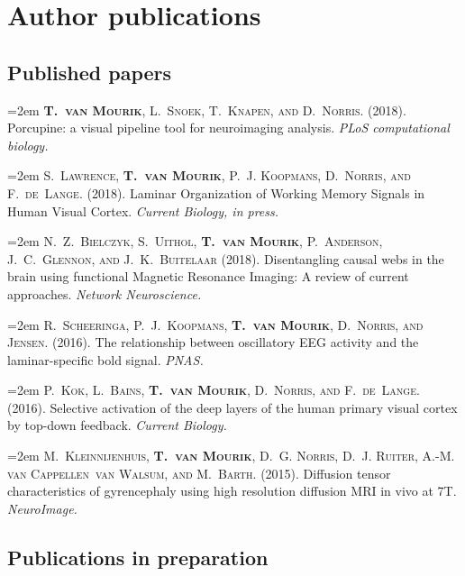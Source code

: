 \section{Author publications}

\subsection{Published papers}

\hangindent=2em
\noindent
\textsc{\textbf{T.~van Mourik}, L.~Snoek, T.~Knapen, and D.~Norris.} 
(2018).
Porcupine: a visual pipeline tool for neuroimaging analysis.
\emph{PLoS computational biology.}


\hangindent=2em
\noindent
\textsc{S.~Lawrence, \textbf{T.~van Mourik}, P.~J. Koopmans, D.~Norris, and F.~de~Lange.} 
(2018).
Laminar Organization of Working Memory Signals in Human Visual Cortex. 
\emph{Current Biology, in press.}


\hangindent=2em
\noindent
\textsc{N.~Z.~Bielczyk, S.~Uithol, \textbf{T.~van Mourik}, P.~Anderson, J.~C.~Glennon, and J.~K.~Buitelaar} 
(2018).
Disentangling causal webs in the brain using functional Magnetic Resonance Imaging: A review of current approaches.
\emph{Network Neuroscience.}


\hangindent=2em
\noindent
\textsc{R.~Scheeringa, P.~J.~Koopmans, \textbf{T.~van Mourik}, D.~Norris, and Jensen.} 
(2016).
The relationship between oscillatory {EEG} activity and the laminar-specific bold signal.
\emph{PNAS.}


\hangindent=2em
\noindent
\textsc{P.~Kok, L.~Bains, \textbf{T.~van Mourik}, D.~Norris, and F.~de~Lange.} 
(2016).
Selective activation of the deep layers of the human primary visual	cortex by top-down feedback.
\emph{Current Biology.}


\hangindent=2em
\noindent
\textsc{M.~Kleinnijenhuis, \textbf{T.~van Mourik}, D.~G. Norris, D.~J. Ruiter, A.-M. van	Cappellen~van Walsum, and M.~Barth.} 
(2015).
Diffusion tensor characteristics of gyrencephaly using high	resolution diffusion {MRI} in vivo at 7{T}.
\emph{NeuroImage.}



\subsection{Publications in preparation}


